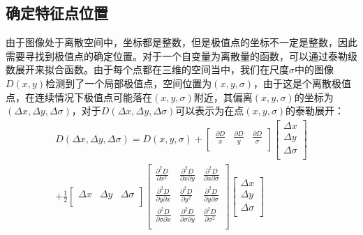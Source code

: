     \subsection{确定特征点位置}
      由于图像处于离散空间中，坐标都是整数，但是极值点的坐标不一定是整数，因此需要寻找到极值点的确定位置。对于一个自变量为离散量的函数，可以通过泰勒级数展开来拟合函数。由于每个点都在三维的空间当中，我们在尺度$\sigma$中的图像$D(x,y)$检测到了一个局部极值点，空间位置为$(x,y,\sigma)$，由于这是个离散极值点，在连续情况下极值点可能落在$(x,y,\sigma)$附近，其偏离$(x,y,\sigma)$的坐标为$(\Delta x,\Delta y,\Delta\sigma)$，对于$D(\Delta x,\Delta y,\Delta\sigma)$可以表示为在点$(x,y,\sigma)$的泰勒展开：
      \begin{equation}
      \begin{aligned}
        D(\Delta x,\Delta y,\Delta\sigma)=D(x,y,\sigma)+\left[
        \begin{array}{ccc}
          \frac{\partial D}{x} & \frac{\partial D}{y} & \frac{\partial D}{\sigma} \\
        \end{array}\right]\left[
        \begin{array}{c}
          \Delta x \\
          \Delta y \\
          \Delta \sigma \\
        \end{array}\right] \\
        +\frac{1}{2}\left[\begin{array}{ccc}
          \Delta x & \Delta y & \Delta\sigma \\
        \end{array}\right]
        \left[\begin{array}{ccc}
          \frac{\partial^2D}{\partial x^2} & \frac{\partial^2D}{\partial x\partial y} & \frac{\partial^2D}{\partial x\partial\sigma} \\
          \frac{\partial^2D}{\partial y\partial x} & \frac{\partial^2D}{\partial y^2} & \frac{\partial^2D}{\partial y\partial\sigma} \\
          \frac{\partial^2D}{\partial\sigma\partial x} & \frac{\partial^2D}{\partial \sigma\partial y} & \frac{\partial^2D}{\partial \sigma^2} \\
        \end{array}\right]
        \left[\begin{array}{c}
          \Delta x \\
          \Delta y \\
          \Delta \sigma \\
        \end{array}\right]
      \end{aligned}
      \end{equation}
